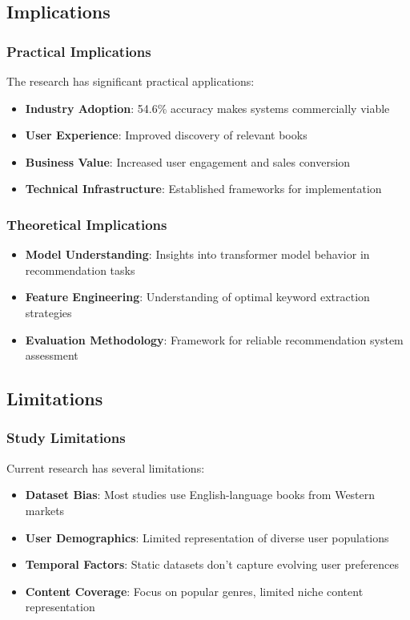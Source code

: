 \documentclass[12pt,a4paper]{article}
\begin{document}
\subsection{Implications}

\subsubsection{Practical Implications}
The research has significant practical applications:
\begin{itemize}
    \item \textbf{Industry Adoption}: 54.6\% accuracy makes systems commercially viable
    \item \textbf{User Experience}: Improved discovery of relevant books
    \item \textbf{Business Value}: Increased user engagement and sales conversion
    \item \textbf{Technical Infrastructure}: Established frameworks for implementation
\end{itemize}

\subsubsection{Theoretical Implications}
\begin{itemize}
    \item \textbf{Model Understanding}: Insights into transformer model behavior in recommendation tasks
    \item \textbf{Feature Engineering}: Understanding of optimal keyword extraction strategies
    \item \textbf{Evaluation Methodology}: Framework for reliable recommendation system assessment
\end{itemize}

\subsection{Limitations}

\subsubsection{Study Limitations}
Current research has several limitations:
\begin{itemize}
    \item \textbf{Dataset Bias}: Most studies use English-language books from Western markets
    \item \textbf{User Demographics}: Limited representation of diverse user populations
    \item \textbf{Temporal Factors}: Static datasets don't capture evolving user preferences
    \item \textbf{Content Coverage}: Focus on popular genres, limited niche content representation
\end{itemize}
\end{document}
